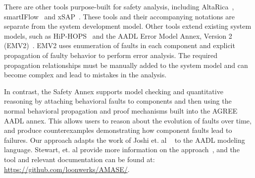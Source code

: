 There are other tools purpose-built for safety analysis, including AltaRica~\cite{PROSVIRNOVA2013127}, smartIFlow~\cite{info8010007} and xSAP~\cite{DBLP:conf/tacas/BittnerBCCGGMMZ16}. These tools and their accompanying notations are separate from the system development model. Other tools extend existing system models, such as HiP-HOPS~\cite{CHEN201391} and the AADL Error Model Annex, Version 2 (EMV2)~\cite{EMV2}. EMV2 uses enumeration of faults in each component and explicit propagation of faulty behavior to perform error analysis. The required propagation relationships must be manually added to the system model and can become complex and lead to mistakes in the analysis.

In contrast, the Safety Annex supports model checking and quantitative reasoning by attaching behavioral faults to components and then using the normal behavioral propagation and proof mechanisms built into the AGREE AADL annex.  This allows users to reason about the evolution of faults over time, and produce counterexamples demonstrating how component faults lead to failures.
Our approach adapts the work of Joshi et. al
~\cite{Joshi05:Dasc} to the AADL modeling language.  Stewart, et. al provide more information on the approach~\cite{Stewart17:IMBSA}, and the tool and relevant documentation can be found at: \small \url{https://github.com/loonwerks/AMASE/}. \normalsize